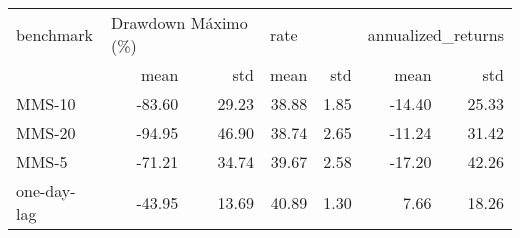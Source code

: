 \begin{tabular}{lrrrrrr}
\toprule
  benchmark & \multicolumn{2}{l}{Drawdown Máximo (\%) } & \multicolumn{2}{l}{rate} & \multicolumn{2}{l}{annualized\_returns} \\
            &                        mean &   std &  mean &  std &               mean &   std \\
\midrule
     MMS-10 &                      -83.60 & 29.23 & 38.88 & 1.85 &             -14.40 & 25.33 \\
     MMS-20 &                      -94.95 & 46.90 & 38.74 & 2.65 &             -11.24 & 31.42 \\
      MMS-5 &                      -71.21 & 34.74 & 39.67 & 2.58 &             -17.20 & 42.26 \\
one-day-lag &                      -43.95 & 13.69 & 40.89 & 1.30 &               7.66 & 18.26 \\
\bottomrule
\end{tabular}
